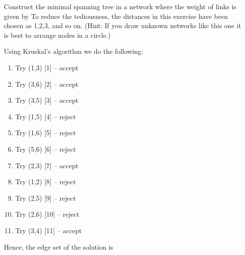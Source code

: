 

Construct the minimal spanning tree in a network where the weight of links is given by
To reduce the tediousness, the distances in this exercise have been chosen as 1,2,3, and so on. (Hint: If you draw unknown networks like this one it is best to arrange nodes in a circle.)


\solution
Using Kruskal's algorithm we do the following:
\begin{enumerate}[label=\arabic*.]
\item Try (1,3) [1] -- accept 
\item Try (3,6) [2] -- accept
\item Try (3,5) [3] -- accept
\item Try (1,5) [4] -- reject
\item Try (1,6) [5] -- reject
\item Try (5,6) [6] -- reject
\item Try (2,3) [7] -- accept
\item Try (1,2) [8] -- reject
\item Try (2,5) [9] -- reject
\item Try (2,6) [10] -- reject
\item Try (3,4) [11] -- accept
\end{enumerate}
Hence, the edge set of the solution is 

